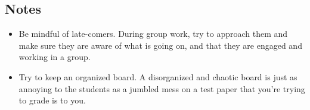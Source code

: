 \documentclass[red]{tutorial}
\theoremstyle{definition}
\theoremstyle{theorem}
\begin{document}
\begin{instructions}
\subsection*{Notes}
  	\begin{itemize}
		\item Be mindful of late-comers. During group work, try to approach them and make sure they are aware of what is going on, and that they are engaged and working in a group.
		\item Try to keep an organized board. A disorganized and chaotic board is just as annoying to the students as a jumbled mess on a test paper that you're trying to grade is to you.
	\end{itemize}
	\end{instructions}
\end{document}
